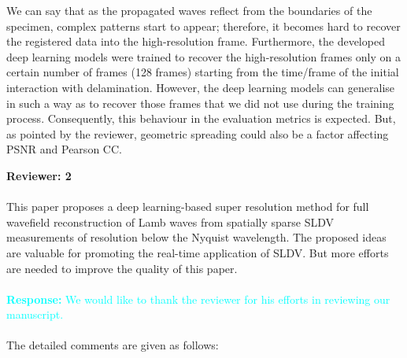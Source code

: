 \documentclass[11pt,a2paper]{report}
\begin{document}
\begin{enumerate}
{			We can say that as the propagated waves reflect from the boundaries of the specimen, complex patterns start to appear; therefore, it becomes hard to recover the registered data into the high-resolution frame.
			Furthermore, the developed deep learning models were trained to recover the high-resolution frames only on a certain number of frames (128 frames) starting from the time/frame of the initial interaction with delamination.
			However, the deep learning models can generalise in such a way as to recover those frames that we did not use during the training process.
			Consequently, this behaviour in the evaluation metrics is expected.
			But, as pointed by the reviewer, geometric spreading could also be a factor affecting PSNR and Pearson CC.
		}
	\end{enumerate}
	
	\noindent\textbf{Reviewer: 2} \\ \\
	This paper proposes a deep learning-based super resolution method for full wavefield reconstruction of Lamb waves from spatially sparse SLDV measurements of resolution below the Nyquist wavelength. 
	The proposed ideas are valuable for promoting the real-time application of SLDV. 
	But more efforts are needed to improve the quality of this paper. \\ \\
	\textcolor{Cyan}
	{
		\textbf{Response:}
		We would like to thank the reviewer for his efforts in reviewing our manuscript.
	} 
	\\ \\
	The detailed comments are given as follows:
\end{document}
